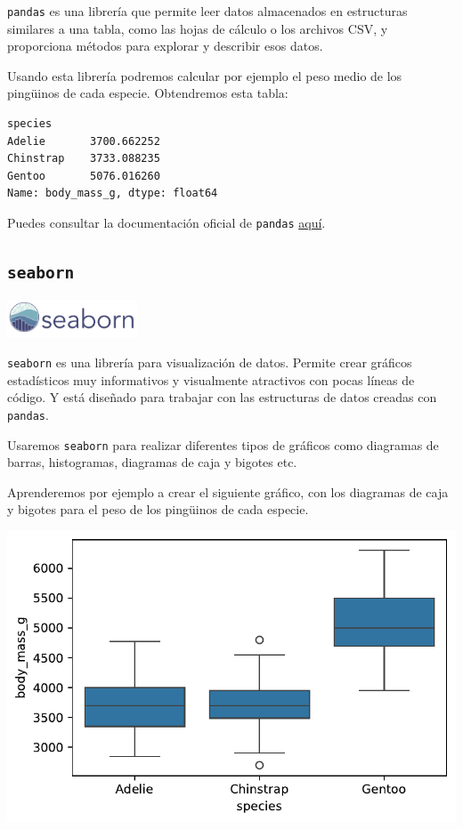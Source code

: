 \documentclass[
  a4paper,
  noprof,
  12pt,
  notoc,
  nosols,
  nobib]{mnye}
\theoremstyle{definition}
\theoremstyle{remark}
\begin{document}
\texttt{pandas} es una librería que permite leer datos almacenados en
estructuras similares a una tabla, como las hojas de cálculo o los
archivos CSV, y proporciona métodos para explorar y describir esos
datos.

Usando esta librería podremos calcular por ejemplo el peso medio de los
pingüinos de cada especie. Obtendremos esta tabla:

\begin{verbatim}
species
Adelie       3700.662252
Chinstrap    3733.088235
Gentoo       5076.016260
Name: body_mass_g, dtype: float64
\end{verbatim}

Puedes consultar la documentación oficial de \texttt{pandas}
\href{https://pandas.pydata.org/docs/index.html}{aquí}.

\subsection{\texorpdfstring{\texttt{seaborn}}{seaborn}}\label{seaborn}

\begin{center}
\includegraphics[width=\textwidth,height=3em]{chapters/../img/seaborn.png}
\end{center}

\texttt{seaborn} es una librería para visualización de datos. Permite
crear gráficos estadísticos muy informativos y visualmente atractivos
con pocas líneas de código. Y está diseñado para trabajar con las
estructuras de datos creadas con \texttt{pandas}.

Usaremos \texttt{seaborn} para realizar diferentes tipos de gráficos
como diagramas de barras, histogramas, diagramas de caja y bigotes etc.

Aprenderemos por ejemplo a crear el siguiente gráfico, con los diagramas
de caja y bigotes para el peso de los pingüinos de cada especie.

\includegraphics{chapters/libraries_files/figure-pdf/cell-5-output-1.pdf}
\end{document}
